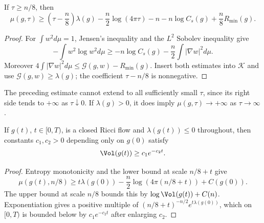 \begin{lemma}
\label{lem:chow-iii-ch17-mu-lower-lambda}
If $\tau\ge n/8$, then
\[
 \mu(g,\tau)\ge\left(\tau-\frac n8\right)\lambda(g)
 -\frac n2\log(4\pi\tau)-n-n\log C_s(g)+\frac n8R_{\min}(g).
\]
\end{lemma}
\begin{proof}
\sketch For $\int w^2d\mu=1$, Jensen's inequality and the $L^2$ Sobolev inequality
give
\[
 -\int w^2\log w^2d\mu\ge-n\log C_s(g)
 -\frac n2\int|\nabla w|^2d\mu.
\]
Moreover
$4\int|\nabla w|^2d\mu\le\mathcal G(g,w)-R_{\min}(g)$.
Insert both estimates into $\mathcal K$ and use
$\mathcal G(g,w)\ge\lambda(g)$; the coefficient $\tau-n/8$ is
nonnegative.
\end{proof}

\begin{remark}
\label{rem:chow-iii-ch17-mu-lower-bound-scales}
The preceding estimate cannot extend to all sufficiently small $\tau$, since
its right side tends to $+\infty$ as $\tau\downarrow0$.  If
$\lambda(g)>0$, it does imply $\mu(g,\tau)\to+\infty$ as
$\tau\to\infty$.
\end{remark}

\begin{lemma}
\label{lem:chow-iii-ch17-volume-lower-nonpositive-lambda}
If $g(t)$, $t\in[0,T)$, is a closed Ricci flow and
$\lambda(g(t))\le0$ throughout, then constants $c_1,c_2>0$ depending only
on $g(0)$ satisfy
\[
 \Vol(g(t))\ge c_1e^{-c_2t}.
\]
\end{lemma}
\begin{proof}
\sketch Entropy monotonicity and the lower bound at scale $n/8+t$ give
\[
 \mu(g(t),n/8)\ge t\lambda(g(0))
 -\frac n2\log(4\pi(n/8+t))+C(g(0)).
\]
The upper bound at scale $n/8$ bounds this by
$\log\Vol(g(t))+C(n)$.  Exponentiation gives a positive multiple of
$(n/8+t)^{-n/2}e^{t\lambda(g(0))}$, which on $[0,T)$ is bounded below by
$c_1e^{-c_2t}$ after enlarging $c_2$.
\end{proof}


